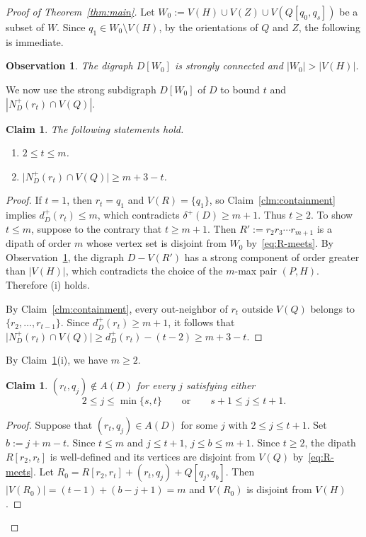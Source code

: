 \documentclass[12pt]{article}
\numberwithin{equation}{section}
\theoremstyle{plain}
\newtheorem{claim}[theorem]{Claim}
\newtheorem{observation}[theorem]{Observation}
\theoremstyle{definition}
\begin{document}
\begin{proof}[Proof of Theorem~\ref{thm:main}]
Let $W_0:=V(H)\cup V(Z)\cup V(Q[q_0,q_s])$ be a subset of $W$.
Since $q_1\in W_0\setminus V(H)$, by the orientations of $Q$ and $Z$, the following is immediate.
\begin{observation}\label{obv:W}
The digraph $D[W_0]$ is strongly connected and $|W_0|>|V(H)|$.
\end{observation}
We now use the strong subdigraph $D[W_0]$ of $D$ to bound $t$ and $|N_D^+(r_t)\cap V(Q)|$.

\begin{claim}\label{clm:outneighbors}
The following statements hold.
\begin{enumerate}[label=\textup{(\roman*)},leftmargin=*,itemsep=1pt]
\item $2\le t\le m$.
\item $\bigl|N_D^+(r_t)\cap V(Q)\bigr|\ge m+3-t$.
\end{enumerate}
\end{claim}

\begin{proof}
If $t=1$, then $r_t=q_1$ and $V(R)=\{q_1\}$, so Claim~\ref{clm:containment} implies $d_D^+(r_t)\le m$, which contradicts $\delta^+(D)\ge m+1$.
Thus $t\ge 2$.
To show $t \le m$, suppose to the contrary that $t\ge m+1$.
Then $R':=r_2r_3\cdots r_{m+1}$ is a dipath of order $m$ whose vertex set is disjoint from $W_0$ by~\eqref{eq:R-meets}.
By Observation~\ref{obv:W}, the digraph $D-V(R')$ has a strong component of order greater than $|V(H)|$, which contradicts the choice of the $m$-max pair $(P,H)$.
Therefore (i) holds.

By Claim~\ref{clm:containment}, every out-neighbor of $r_t$ outside $V(Q)$ belongs to $\{r_2,\ldots,r_{t-1}\}$.
Since $d_D^+(r_t)\ge m+1$, it follows that $\bigl|N_D^+(r_t)\cap V(Q)\bigr|\ge d_D^+(r_t)-(t-2)\ge m+3-t$.
\end{proof}

By Claim~\ref{clm:outneighbors}(i), we have $m\ge2$.

\smallskip
\begin{claim}\label{clm:rotation}
$(r_t,q_j)\notin A(D)$ for every $j$ satisfying either
\[
2\le j\le\min\{s,t\} \qquad \text{or} \qquad s+1\le j\le t+1.
\]
\end{claim}

\begin{proof}
Suppose that $(r_t,q_j)\in A(D)$ for some $j$ with $2\le j\le t+1$. Set $b:=j+m-t$.
Since $t\le m$ and $j\le t+1$, $j\le b\le m+1$.
Since $t\ge2$, the dipath $R[r_2,r_t]$ is well-defined and its vertices are disjoint from $V(Q)$ by~\eqref{eq:R-meets}.
Let $R_0=R[r_2,r_t]+(r_t,q_j)+Q[q_j,q_b]$.
Then $|V(R_0)|=(t-1)+(b-j+1)=m$ and $V(R_0)$ is disjoint from $V(H)$.


\end{proof}
\end{proof}
\end{document}
